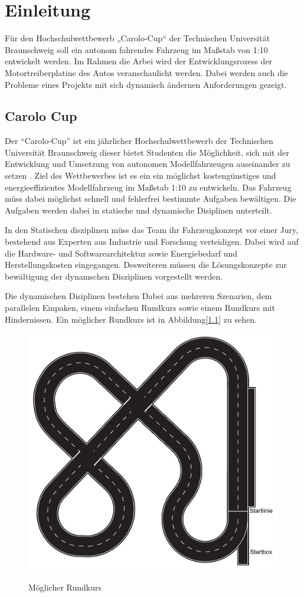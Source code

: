 \chapter{Einleitung}

Für den Hochschulwettbewerb „Carolo-Cup“ der Technischen Universität Braunschweig soll ein autonom fahrendes Fahrzeug im Maßstab von 1:10
entwickelt werden. Im Rahmen die Arbei wird der Entwicklungsrozess der Motortreiberplatine des Autos veranschaulicht werden.
Dabei werden auch die Probleme eines Projekts mit sich dynamisch ändernen Anforderungen gezeigt. 


\section{Carolo Cup}
Der ``Carolo-Cup'' ist ein jährlicher Hochschulwettbewerb der Technischen Universität Braunschweig dieser bietet Studenten die Möglichkeit, sich mit der Entwicklung 
und Umsetzung von autonomen Modellfahrzeugen auseinander zu setzen \cite{website-carolo-cup}. Ziel des Wettbewerbes ist es ein ein möglichst kostengünstiges
und energieeffizientes Modellfahrzeug im Maßstab 1:10 zu entwickeln. Das Fahrzeug müss dabei möglichst schnell und fehlerfrei bestimmte Aufgaben
bewältigen. Die Aufgaben werden dabei in statische und dynamische Disiplinen unterteilt. 

In den Statischen disziplinen müss das Team ihr Fahrzeugkonzept vor einer Jury, bestehend aus Experten aus Industrie und Forschung verteidigen.
Dabei wird auf die Hardware- und Softwarearchitektur sowie Energiebedarf und Herstellungskosten eingegangen. Desweiteren müssen die Lösungskonzepte
zur bewältigung der dynamschen Disziplinen vorgestellt werden.

Die dynamischen Disiplinen bestehen Dabei aus mehreren Szenarien, dem parallelen Einpaken, einem einfachen Rundkurs sowie einem Rundkurs mit Hindernissen.
Ein möglicher Rundkurs ist in Abbildung[\ref{fig:Rundkurs}] zu sehen.

\begin{figure}[H]
\centering
\includegraphics[width=.8\textwidth]{Strecke.png}\\
\caption{Möglicher Rundkurs \cite{website-carolo-cup-regelwerk}}
\label{fig:Rundkurs}
\end{figure}

